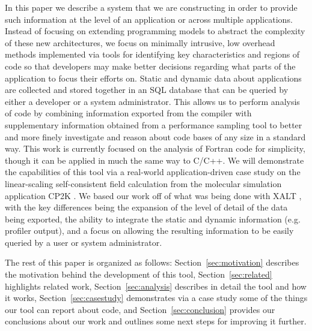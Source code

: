 In this paper we describe a system 
that we are constructing in order to provide such information at the level of an application or across multiple applications.
Instead of focusing on extending programming models to abstract the complexity of these new architectures, we focus on minimally intrusive, low overhead methods implemented via tools for identifying key characteristics and regions of code so that developers may make better decisions regarding what parts of the application to focus their efforts on.
Static and dynamic data about applications are collected and stored together in an \acs{SQL} database that can be queried by either a developer or a system administrator.
This allows us to perform analysis of code by combining information exported from the compiler with supplementary information obtained from a performance sampling tool to better and more finely investigate  and reason about code bases of any size in a standard way.
This work is currently focused on the analysis of Fortran code for simplicity,
though it can be applied in much the same way to C/C++.
We will demonstrate the capabilities of this tool via a real-world application-driven case study on the linear-scaling self-consistent field calculation \cite{vandevondele2012linear} from the molecular simulation application CP2K \cite{hutter2014cp2k}.
We based our work off of what was being done with XALT \cite{7081224}, with the key differences being the expansion of the level of detail of the data being exported, the ability to integrate the static and dynamic information (e.g. profiler output), and a focus on allowing the resulting information to be easily queried by a user or system administrator.

The rest of this paper is organized as follows: Section~\ref{sec:motivation} describes the motivation behind the development of this tool, Section~\ref{sec:related} highlights related work, Section~\ref{sec:analysis} describes in detail the tool and how it works, Section~\ref{sec:casestudy} demonstrates via a case study some of the things our tool can report about code, and Section~\ref{sec:conclusion} provides our conclusions about our work and outlines some next steps for improving it further.
